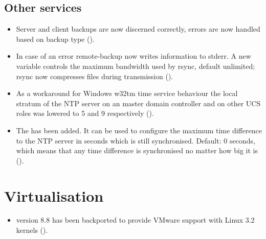 \subsection{Other services}
\begin{itemize}
\item Server and client backups are now discerned correctly, errors
  are now handled based on backup type ().

\item In case of an error remote-backup now writes information to
  stderr. A new variable  controls the maximum
  bandwidth used by rsync, default unlimited; rsync now compresses
  files during transmission ().

\item As a workaround for Windows w32tm time service behaviour the
  local stratum of the NTP server on an master domain controller
  and on other UCS roles was lowered to 5 and 9 respectively
  ().

\item The  has been added. It can be used to
  configure the maximum time difference to the NTP server in seconds
  which is still synchronised. Default: 0 seconds, which means that
  any time difference is synchronised no matter how big it is
  ().
\end{itemize}


\section{Virtualisation}

\begin{itemize}
\item {} version 8.8 has been backported
 to provide VMware support with Linux 3.2 kernels
  ().
\end{itemize}


